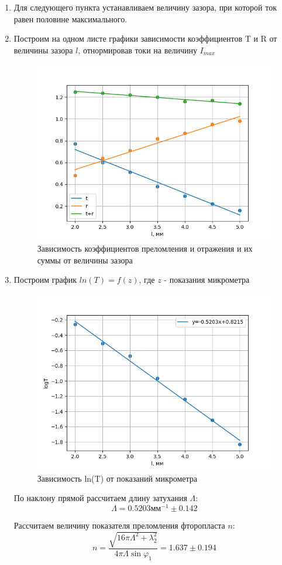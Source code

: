 \documentclass[a4paper,12pt]{article}
\begin{document}
\begin{enumerate}
    \item Для следующего пункта устанавливаем величину зазора, при которой ток равен половине максимального.
    \newpage
    \item Построим на одном листе графики зависимости коэффициентов T и R от величины зазора $l$, отнормировав токи на величину $I_{max}$

    \begin{figure}[h]
    \centering
    \includegraphics[width=0.65\linewidth]{graph1.png}
    \caption{Зависимость коэффициентов преломления и отражения и их суммы от величины зазора}
    \label{graph1}
    \end{figure}
    
    \item Построим график $ln(T)=f(z)$, где $z$ - показания микрометра

    \begin{figure}[h]
    \centering
    \includegraphics[width=0.65\linewidth]{graph2.png}
    \caption{Зависимость ln(T) от показаний микрометра}
    \label{graph2}
    \end{figure}
    

    По наклону прямой рассчитаем длину затухания $\Lambda$:
    $$
    \Lambda = 0.5203 \text{мм}^{-1} \pm 0.142
    $$
    
    Рассчитаем величину показателя преломления фторопласта $n$:
    $$
    n=\frac{\sqrt{16\pi\Lambda^2+\lambda_2^2}}{4\pi\Lambda\sin\varphi_1} = 1.637 \pm 0.194
    $$
    
\end{enumerate}
\newpage
\end{document}
